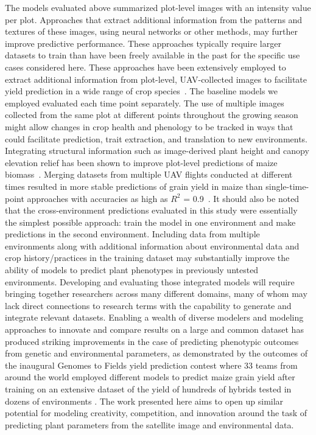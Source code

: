 \documentclass[12pt,twoside]{gsag3jnl}
\begin{document}
The models evaluated above summarized plot-level images with an intensity value per plot. Approaches that extract additional information from the patterns and textures of these images, using neural networks or other methods, may further improve predictive performance. These approaches typically require larger datasets to train than have been freely available in the past for the specific use cases considered here.  %
These approaches have been extensively employed to extract additional information from plot-level, UAV-collected images to facilitate yield prediction in a wide range of crop species~\citep{yang2019deep,nevavuori2019crop,van2020crop}. The baseline models we employed evaluated each time point separately. The use of multiple images collected from the same plot at different points throughout the growing season might allow changes in crop health and phenology to be tracked in ways that could facilitate prediction, trait extraction, and translation to new environments. Integrating structural information such as image-derived plant height and canopy elevation relief has been shown to improve plot-level predictions of maize biomass~\citep{han2019modeling}. Merging datasets from multiple UAV flights conducted at different times resulted in more stable predictions of grain yield in maize than single-time-point approaches with accuracies as high as $R^2$ = 0.9~\citep{adak2023temporal}. It should also be noted that the cross-environment predictions evaluated in this study were essentially the simplest possible approach: train the model in one environment and make predictions in the second environment. Including data from multiple environments along with additional information about environmental data and crop history/practices in the training dataset may substantially improve the ability of models to predict plant phenotypes in previously untested environments. Developing and evaluating those integrated models will require bringing together researchers across many different domains, many of whom may lack direct connections to research terms with the capability to generate and integrate relevant datasets. Enabling a wealth of diverse modelers and modeling approaches to innovate and compare results on a large and common dataset has produced striking improvements in the case of predicting phenotypic outcomes from genetic and environmental parameters, as demonstrated by the outcomes of the inaugural Genomes to Fields yield prediction contest where 33 teams from around the world employed different models to predict maize grain yield after training on an extensive dataset of the yield of hundreds of hybrids tested in dozens of environments \citep{lima2023genomes}. The work presented here aims to open up similar potential for modeling creativity, competition, and innovation around the task of predicting plant parameters from the satellite image and environmental data.
\end{document}
